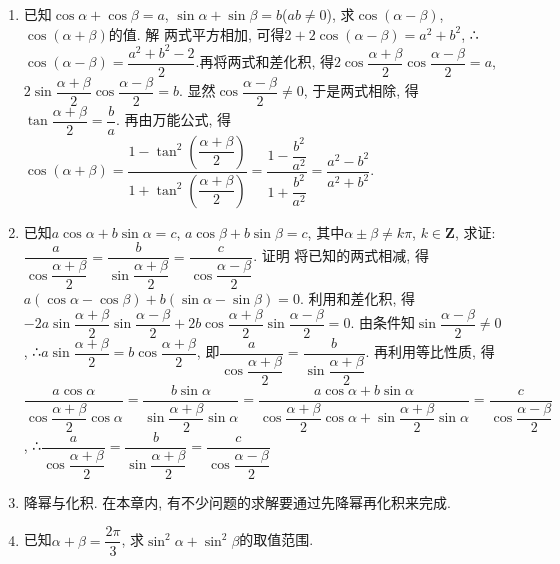 \documentclass[10pt,a4paper]{article}
\begin{document}
\begin{enumerate}[1.]
\item 已知$\cos \alpha +\cos \beta =a$, $\sin \alpha +\sin \beta =b$($ab\ne 0$), 求$\cos (\alpha -\beta)$, $\cos (\alpha +\beta)$的值.
解  两式平方相加, 可得$2+2\cos (\alpha -\beta)=a^2+b^2$, ∴$\cos (\alpha -\beta)=\dfrac{a^2+b^2-2}2$.再将两式和差化积, 得$2\cos \dfrac{\alpha +\beta}2\cos \dfrac{\alpha -\beta}2=a$, $2\sin \dfrac{\alpha +\beta}2\cos \dfrac{\alpha -\beta}2=b$.
显然$\cos \dfrac{\alpha -\beta}2\ne 0$, 于是两式相除, 得$\tan \dfrac{\alpha +\beta}2=\dfrac ba$.
再由万能公式, 得$\cos (\alpha +\beta)=\dfrac{1-\tan ^2(\dfrac{\alpha +\beta} 2)}{1+\tan ^2(\dfrac{\alpha +\beta}2)}=\dfrac{1-\dfrac{b^2}{a^2}}{1+\dfrac{b^2}{a^2}}=\dfrac{a^2-b^2}{a^2+b^2}$.
\item 已知$a\cos \alpha +b\sin \alpha =c$, $a\cos \beta +b\sin \beta =c$, 其中$\alpha \pm \beta \ne k\pi$, $k\in \mathbf{Z}$, 求证: $\dfrac a{\cos \dfrac{\alpha +\beta}2}=\dfrac b{\sin \dfrac{\alpha +\beta}2}=\dfrac c{\cos \dfrac{\alpha -\beta}2}$.
证明  将已知的两式相减, 得$a(\cos \alpha -\cos \beta)+b(\sin \alpha -\sin \beta)=0$.
利用和差化积, 得$-2a\sin \dfrac{\alpha +\beta}2\sin \dfrac{\alpha -\beta}2+2b\cos \dfrac{\alpha +\beta}2\sin \dfrac{\alpha -\beta}2=0$.
由条件知$\sin \dfrac{\alpha -\beta}2\ne 0$, ∴$a\sin \dfrac{\alpha +\beta}2=b\cos \dfrac{\alpha +\beta}2$, 即$\dfrac a{\cos \dfrac{\alpha +\beta}2}=\dfrac b{\sin \dfrac{\alpha +\beta}2}$.
再利用等比性质, 得$\dfrac{a\cos \alpha}{\cos \dfrac{\alpha +\beta}2\cos \alpha}=\dfrac{b\sin \alpha}{\sin \dfrac{\alpha +\beta}2\sin \alpha}=\dfrac{a\cos \alpha +b\sin \alpha}{\cos \dfrac{\alpha +\beta}2\cos \alpha +\sin \dfrac{\alpha +\beta}2\sin \alpha}=\dfrac c{\cos \dfrac{\alpha -\beta}2}$,
∴$\dfrac a{\cos \dfrac{\alpha +\beta}2}=\dfrac b{\sin \dfrac{\alpha +\beta}2}=\dfrac c{\cos \dfrac{\alpha -\beta}2}$
\item 降幂与化积.
在本章内, 有不少问题的求解要通过先降幂再化积来完成.
\item 已知$\alpha +\beta =\dfrac{2\pi}3$, 求$\sin ^2\alpha +\sin ^2\beta$的取值范围.


\end{enumerate}
\end{document}

